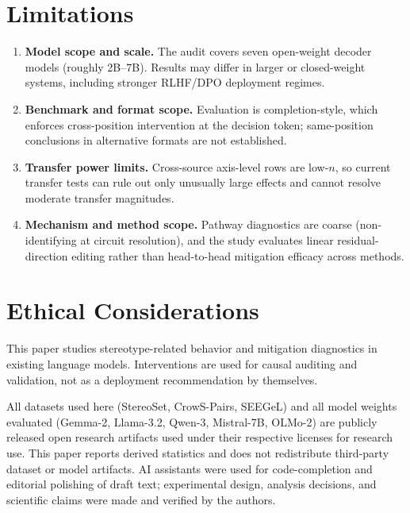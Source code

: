 \section{Limitations}
\begin{enumerate}[leftmargin=*]
  \item \textbf{Model scope and scale.} The audit covers seven open-weight decoder models (roughly 2B--7B). Results may differ in larger or closed-weight systems, including stronger RLHF/DPO deployment regimes.
  \item \textbf{Benchmark and format scope.} Evaluation is completion-style, which enforces cross-position intervention at the decision token; same-position conclusions in alternative formats are not established.
  \item \textbf{Transfer power limits.} Cross-source axis-level rows are low-$n$, so current transfer tests can rule out only unusually large effects and cannot resolve moderate transfer magnitudes.
  \item \textbf{Mechanism and method scope.} Pathway diagnostics are coarse (non-identifying at circuit resolution), and the study evaluates linear residual-direction editing rather than head-to-head mitigation efficacy across methods.
\end{enumerate}

\section{Ethical Considerations}
This paper studies stereotype-related behavior and mitigation diagnostics in existing language models. Interventions are used for causal auditing and validation, not as a deployment recommendation by themselves.

All datasets used here (StereoSet, CrowS-Pairs, SEEGeL) and all model weights evaluated (Gemma-2, Llama-3.2, Qwen-3, Mistral-7B, OLMo-2) are publicly released open research artifacts used under their respective licenses for research use. This paper reports derived statistics and does not redistribute third-party dataset or model artifacts. AI assistants were used for code-completion and editorial polishing of draft text; experimental design, analysis decisions, and scientific claims were made and verified by the authors.
